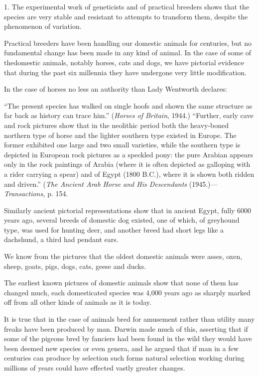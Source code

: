 1. The experimental work of geneticists and of practical breeders shows that the species are
very stable and resistant to attempts to transform them, despite the phenomenon of variation.

Practical breeders have been handling our domestic animals for centuries, but no
fundamental change has been made in any kind of animal. In the case of some of thedomestic animals,
notably horses, cats and dogs, we have pictorial evidence that during the
past six millennia they have undergone very little modification.

In the case of horses no less an authority than Lady Wentworth declares:

``The present species has walked on single hoofs and shown the same structure as far back as
history can trace him.'' (\textit{Horses of Britain}, 1944.) ``Further, early cave and rock pictures show
that in the neolithic period both the heavy-boned northern type of horse and the lighter
southern type existed in Europe. The former exhibited one large and two small varieties,
while the southern type is depicted in European rock pictures as a speckled pony: the pure
Arabian appears only in the rock paintings of Arabia (where it is often depicted as galloping
with a rider carrying a spear) and of Egypt (1800 B.C.), where it is shown both ridden and
driven.'' (\textit{The Ancient Arab Horse and His Descendants} (1945.)—\textit{Transactions,} p. 154.

Similarly ancient pictorial representations show that in ancient Egypt, fully 6000 years ago,
several breeds of domestic dog existed, one of which, of greyhound type, was used for
hunting deer, and another breed had short legs like a dachshund, a third had pendant ears.

We know from the pictures that the oldest domestic animals were asses, oxen, sheep, goats,
pigs, dogs, cats, geese and ducks.

The earliest known pictures of domestic animals show that none of them has changed much,
each domesticated species was 4,000 years ago as sharply marked off from all other kinds of
animals as it is today.

It is true that in the case of animals bred for amusement rather than utility many freaks have
been produced by man. Darwin made much of this, asserting that if some of the pigeons bred
by fanciers had been found in the wild they would have been deemed new species or even
genera, and he argued that if man in a few centuries can produce by selection such forms
natural selection working during millions of years could have effected vastly greater changes.

